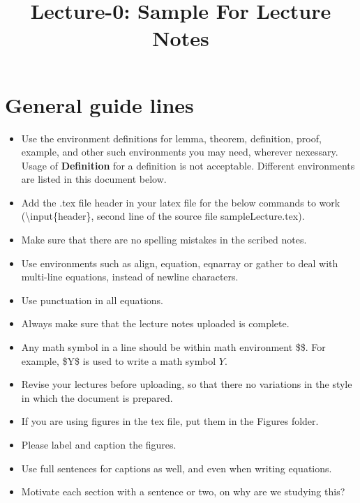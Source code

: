 \documentclass[letterpaper,english,12pt]{article}
\title{Lecture-0: Sample For Lecture Notes}
\author{}
\begin{document}
\maketitle
\section{General guide lines}
\begin{itemize}
\item Use the environment definitions for lemma, theorem, definition, proof, example, and other such environments you may need, wherever nexessary. Usage of {\bf Definition} for a definition is not acceptable. Different environments are listed in this document below.
\item Add the .tex file header in your latex file for the below commands to work (\textbackslash input\{header\}, second line of the source file sampleLecture.tex).
\item Make sure that there are no spelling mistakes in the scribed notes.
\item Use environments such as align, equation, eqnarray or gather to deal with multi-line equations, instead of newline characters. 
\item Use punctuation in all equations.
\item Always make sure that the lecture notes uploaded is complete.
\item Any math symbol in a line should be within math environment \$\$. For example, \$Y\$ is used to write a math symbol $Y$.
\item Revise your lectures before uploading, so that there no variations in the style in which the document is prepared.
\item If you are using figures in the tex file, put them in the Figures folder.
\item Please label and caption the figures.
\item Use full sentences for captions as well, and even when writing equations.
\item Motivate each section with a sentence or two, on why are we studying this?
\end{itemize}
\end{document}
